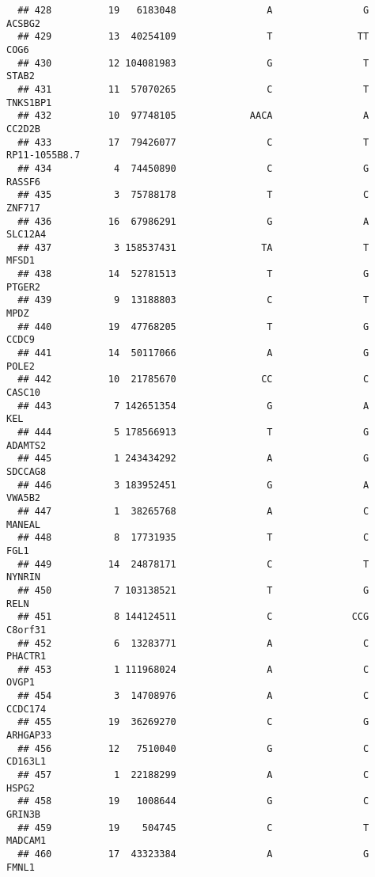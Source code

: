\documentclass[12pt,twoside]{reedthesis}
\theoremstyle{definition}
\theoremstyle{definition}
\theoremstyle{remark}
\begin{document}
\begin{verbatim}
  ## 428          19   6183048                A                G         ACSBG2
  ## 429          13  40254109                T               TT           COG6
  ## 430          12 104081983                G                T          STAB2
  ## 431          11  57070265                C                T       TNKS1BP1
  ## 432          10  97748105             AACA                A         CC2D2B
  ## 433          17  79426077                C                T  RP11-1055B8.7
  ## 434           4  74450890                C                G         RASSF6
  ## 435           3  75788178                T                C         ZNF717
  ## 436          16  67986291                G                A        SLC12A4
  ## 437           3 158537431               TA                T          MFSD1
  ## 438          14  52781513                T                G         PTGER2
  ## 439           9  13188803                C                T           MPDZ
  ## 440          19  47768205                T                G          CCDC9
  ## 441          14  50117066                A                G          POLE2
  ## 442          10  21785670               CC                C         CASC10
  ## 443           7 142651354                G                A            KEL
  ## 444           5 178566913                T                G        ADAMTS2
  ## 445           1 243434292                A                G        SDCCAG8
  ## 446           3 183952451                G                A         VWA5B2
  ## 447           1  38265768                A                C         MANEAL
  ## 448           8  17731935                T                C           FGL1
  ## 449          14  24878171                C                T         NYNRIN
  ## 450           7 103138521                T                G           RELN
  ## 451           8 144124511                C              CCG        C8orf31
  ## 452           6  13283771                A                C        PHACTR1
  ## 453           1 111968024                A                C          OVGP1
  ## 454           3  14708976                A                C        CCDC174
  ## 455          19  36269270                C                G       ARHGAP33
  ## 456          12   7510040                G                C        CD163L1
  ## 457           1  22188299                A                C          HSPG2
  ## 458          19   1008644                G                C         GRIN3B
  ## 459          19    504745                C                T        MADCAM1
  ## 460          17  43323384                A                G          FMNL1

\end{verbatim}
\end{document}
